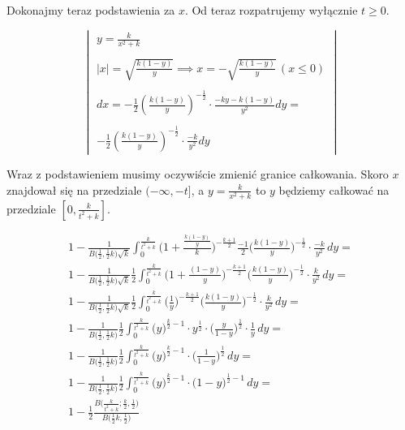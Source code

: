 \documentclass{article}
\begin{document}
\pagebreak

Dokonajmy teraz podstawienia za $x$. Od teraz rozpatrujemy wyłącznie $t \geq 0$.

$$
    \begin{vmatrix}
    y = \frac{k}{x^2 + k}\\ \\
    |x| = \sqrt{\frac{k(1-y)}{y}}  \implies x = -\sqrt{\frac{k(1-y)}{y}} \, (x \leq 0)\\ \\
    dx = - \frac{1}{2} (\frac{k(1-y)}{y})^{-\frac{1}{2}} \cdot \frac{-ky - k(1-y)}{y^2}  dy = \\ \\
    -\frac{1}{2} (\frac{k(1-y)}{y})^{-\frac{1}{2}} \cdot \frac{-k}{y^2}  dy
    \end{vmatrix} 
$$

Wraz z podstawieniem musimy oczywiście zmienić granice całkowania. Skoro $x$ znajdował się na przedziale $(-\infty, -t]$, a $y = \frac{k}{x^2 + k}$ to $y$ będziemy całkować na przedziale $[0, \frac{k}{t^2 + k}]$.

\begin{gather*}
        1 - \frac{1}{B{\Big(\frac{1}{2},\frac{1}{2}k\Big) \sqrt{k}}} \int_{0}^{\frac{k}{t^2 + k}} \Big(1 + \frac{\frac{k(1-y)}{y}}{k}\Big)^{-\frac{k+1}{2}} \frac{-1}{2} \Big(\frac{k(1-y)}{y}\Big)^{-\frac{1}{2}} \cdot \frac{-k}{y^2}  \, dy =\\ 
         1 - \frac{1}{B{\Big(\frac{1}{2},\frac{1}{2}k\Big) \sqrt{k}}} \frac{1}{2}  
         \int_{0}^{\frac{k}{t^2 + k}} 
         \Big(1 + \frac{(1-y)}{y}\Big)^{-\frac{k+1}{2}} 
         \Big(\frac{k(1-y)}{y}\Big)^{-\frac{1}{2}} \cdot \frac{k}{y^2}  \, dy =\\ 
        1 - \frac{1}{B{\Big(\frac{1}{2},\frac{1}{2}k\Big) \sqrt{k}}} \frac{1}{2}  
        \int_{0}^{\frac{k}{t^2 + k}} 
        \Big(\frac{1}{y}\Big)^{-\frac{k+1}{2}} 
        \Big(\frac{k(1-y)}{y}\Big)^{-\frac{1}{2}} \cdot 
        \frac{k}{y^2}  \, dy =\\ 
        1 - \frac{1}{B{\Big(\frac{1}{2},\frac{1}{2}k\Big) }} \frac{1}{2}  
        \int_{0}^{\frac{k}{t^2 + k}} 
        \Big(y\Big)^{\frac{k}{2} - 1} \cdot y ^{\frac{1}{2}} \cdot
        \Big(\frac{y}{1-y}\Big)^{\frac{1}{2}} \cdot 
        \frac{1}{y}  \, dy =\\ 
        1 - \frac{1}{B{\Big(\frac{1}{2},\frac{1}{2}k\Big) }} \frac{1}{2}  
        \int_{0}^{\frac{k}{t^2 + k}} 
        \Big(y\Big)^{\frac{k}{2} - 1} \cdot
        \Big(\frac{1}{1-y}\Big)^{\frac{1}{2}} \, dy =\\ 
        1 - \frac{1}{B{\Big(\frac{1}{2},\frac{1}{2}k\Big) }} \frac{1}{2}  
        \int_{0}^{\frac{k}{t^2 + k}} 
        \Big(y\Big)^{\frac{k}{2} - 1} \cdot
        \Big(1-y\Big)^{\frac{1}{2} - 1} \, dy =\\ 
        1 - \frac{1}{2} \frac{B\Big(\frac{k}{t^2 + k}; \frac{k}{2}, \frac{1}{2}\Big)}{B{\Big(\frac{1}{2}k, \frac{1}{2}\Big) }} 
\end{gather*}
\end{document}
